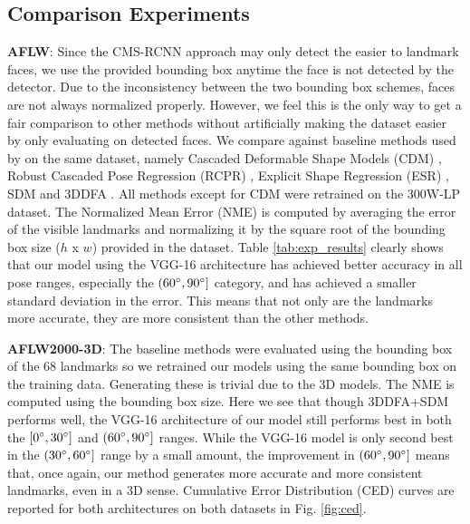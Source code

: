 \documentclass[10pt,twocolumn,letterpaper]{article}
\begin{document}
\subsection{Comparison Experiments}
\textbf{AFLW}: Since the CMS-RCNN approach may only detect the easier to landmark faces, we use the provided bounding box anytime the face is not detected by the detector. Due to the inconsistency between the two bounding box schemes, faces are not always normalized properly. However, we feel this is the only way to get a fair comparison to other methods without artificially making the dataset easier by only evaluating on detected faces. We compare against baseline methods used by \cite{Zhu16falp} on the same dataset, namely Cascaded Deformable Shape Models (CDM) \cite{cdm}, Robust Cascaded Pose Regression (RCPR) \cite{rcpr}, Explicit Shape Regression (ESR) \cite{esr}, SDM \cite{xiong2013supervised} and 3DDFA \cite{Zhu16falp}. All methods except for CDM were retrained on the 300W-LP dataset. The Normalized Mean Error (NME) is computed by averaging the error of the visible landmarks and normalizing it by the square root of the bounding box size ($h$ x $w$) provided in the dataset. Table \ref{tab:exp_results} clearly shows that our model using the VGG-16 architecture has achieved better accuracy in all pose ranges, especially the $(60\degree, 90\degree]$ category, and has achieved a smaller standard deviation in the error. This means that not only are the landmarks more accurate, they are more consistent than the other methods.


\textbf{AFLW2000-3D}: The baseline methods were evaluated using the bounding box of the 68 landmarks so we retrained our models using the same bounding box on the training data. Generating these is trivial due to the 3D models. The NME is computed using the bounding box size. Here we see that though 3DDFA+SDM performs well, the VGG-16 architecture of our model still performs best in both the $[0\degree, 30\degree]$ and $(60\degree, 90\degree]$ ranges. While the VGG-16 model is only second best in the $(30\degree, 60\degree]$ range by a small amount, the improvement in $(60\degree, 90\degree]$ means that, once again, our method generates more accurate and more consistent landmarks, even in a 3D sense. Cumulative Error Distribution (CED) curves are reported for both architectures on both datasets in Fig. \ref{fig:ced}.
\end{document}

